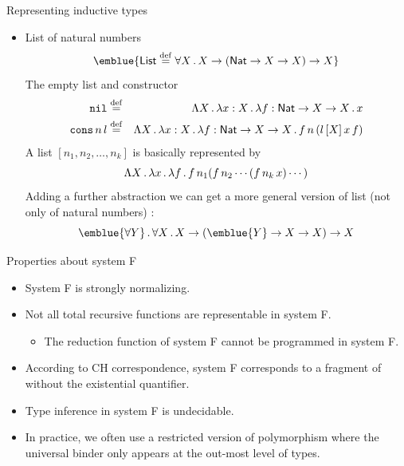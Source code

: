 \documentclass[paper=screen,mode=present,style=zysimple]{powerdot}
\begin{document}
\begin{slide}{Representing inductive types}
\begin{itemize}
\item List of natural numbers
\[
\emblue{\tlist \defeq \forall X \ldot X \to (\tnat \to X \to X) \to X}
\]
The empty list and constructor
\begin{eqnarray*}
\mathtt{nil} & \stackrel{\mathrm{def}}{=} & \Lambda X \, . \, \lambda x : X \, . \, \lambda f : \mathsf{Nat} \to X \to X \, . \, x
\\
\mathtt{cons} \, n \, l & \stackrel{\mathrm{def}}{=} & \Lambda X \, . \, 
\lambda x : X \, . \, \lambda f : \mathsf{Nat} \to X \to X \, . \, f \, n \, (l \, [X] \, x \, f)
\end{eqnarray*}
A list $[n_1, n_2, \ldots , n_k]$ is basically represented by 
\[
\Lambda X \, . \, \lambda x \, . \, \lambda f \, . \, f \, n_1 ( f \, n_2  \cdots (f \, n_k \, x) \cdots )
\]
Adding a further abstraction we can get a more general version of list (not only of natural numbers) :
\[
\emblue{\forall Y} \ldot \forall X \ldot X \to (\emblue{Y} \to X \to X) \to X 
\]
\end{itemize}
\end{slide}

\begin{slide}{Properties about  system F}
\begin{itemize}
\item System F is strongly normalizing.
\item Not all total recursive functions are representable in system F.
\begin{itemize}
\item The reduction function of system F cannot be programmed in system F.
\end{itemize}
\item According to CH correspondence, system F corresponds to a fragment of  
  without the existential quantifier.
\item Type inference in system F is undecidable.
\item In practice, we often use a restricted version of polymorphism where the universal binder only 
  appears at the out-most level of types.
\end{itemize}
\end{slide}
\end{document}
